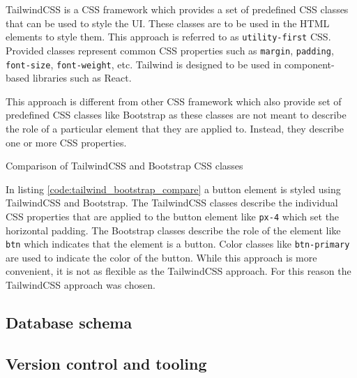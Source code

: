 \documentclass[../main.tex]{subfiles}
\begin{document}
TailwindCSS is a CSS framework which provides a set of predefined CSS classes that can be used to style the UI.
These classes are to be used in the HTML elements to style them. This approach is referred to as \texttt{utility-first} CSS.
Provided classes represent common CSS properties such as \texttt{margin}, \texttt{padding}, \texttt{font-size}, \texttt{font-weight}, etc.
Tailwind is designed to be used in component-based libraries such as React.

This approach is different from other CSS framework which also provide set of predefined CSS classes like Bootstrap \cite{bootstrap}
as these classes are not meant to describe the role of a particular element that they are applied to. Instead, they describe one or more CSS properties.

\begin{listing}[H]
  \caption{Comparison of TailwindCSS and Bootstrap CSS classes}
  \label{code:tailwind_bootstrap_compare}
\end{listing}

In listing \ref{code:tailwind_bootstrap_compare} a button element is styled using TailwindCSS and Bootstrap.
The TailwindCSS classes describe the individual CSS properties that are applied to the button element like
\texttt{px-4} which set the horizontal padding. The Bootstrap classes describe the role of the element like \texttt{btn} which
indicates that the element is a button. Color classes like \texttt{btn-primary} are used to indicate the color of the button.
While this approach is more convenient, it is not as flexible as the TailwindCSS approach. For this reason the TailwindCSS approach was chosen.



\subsection{Database schema}


\subsection{Version control and tooling}
\end{document}
